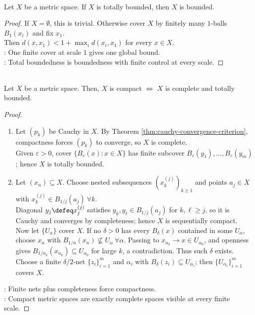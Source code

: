 \begin{theorem} \label{thm:total-bounded-implies-bounded} \\
Let $X$ be a metric space.
If $X$ is totally bounded, then $X$ is bounded.
\begin{proof}
If $X=\emptyset$, this is trivial. Otherwise cover $X$ by finitely many $1$-balls $B_1(x_i)$ and fix $x_1$.\\
Then $d(x,x_1)<1+\max_i d(x_i,x_1)$ for every $x\in X$.\\
: One finite cover at scale $1$ gives one global bound.\\
: Total boundedness is boundedness with finite control at every scale.
\end{proof}
\end{theorem}

\begin{theorem} \label{thm:compact-complete-totally-bounded} \\
Let $X$ be a metric space. Then, $X$ is compact $\Longleftrightarrow$ $X$ is complete and totally bounded.
\begin{proof}
\begin{enumerate}[label=\roman*.]
\setlength{\itemsep}{0pt}
\item[$(\Rightarrow)$] Let $(p_k)$ be Cauchy in $X$. By Theorem \ref{thm:cauchy-convergence-criterion}, compactness forces $(p_k)$ to converge, so $X$ is complete.\\
Given $\varepsilon>0$, cover $\{B_\varepsilon(x):x\in X\}$ has finite subcover $B_\varepsilon(y_1),\ldots,B_\varepsilon(y_m)$; hence $X$ is totally bounded.
\item[$(\Leftarrow)$] Let $(x_n)\subseteq X$. Choose nested subsequences $(x_k^{(j)})_{k\geq1}$ and points $a_j\in X$ with $x_k^{(j)}\in B_{1/j}(a_j) \ \forall k$.\\
Diagonal $y_j\defeq x_j^{(j)}$ satisfies $y_k,y_\ell\in B_{1/j}(a_j)$ for $k,\ell\geq j$, so it is Cauchy and converges by completeness; hence $X$ is sequentially compact. Now let $\{U_\alpha\}$ cover $X$. If no $\delta>0$ has every $B_\delta(x)$ contained in some $U_\alpha$, choose $x_n$ with $B_{1/n}(x_n)\nsubseteq U_\alpha \ \forall\alpha$. Passing to $x_{n_k}\to x\in U_{\alpha_0}$, and openness gives $B_{1/n_k}(x_{n_k})\subseteq U_{\alpha_0}$ for large $k$, a contradiction. Thus such $\delta$ exists.\\
Choose a finite $\delta/2$-net $\{z_i\}_{i=1}^m$ and $\alpha_i$ with $B_\delta(z_i)\subseteq U_{\alpha_i}$; then $\{U_{\alpha_i}\}_{i=1}^m$ covers $X$.
\end{enumerate}
: Finite nets plus completeness force compactness.\\
: Compact metric spaces are exactly complete spaces visible at every finite scale.
\end{proof}
\end{theorem}

